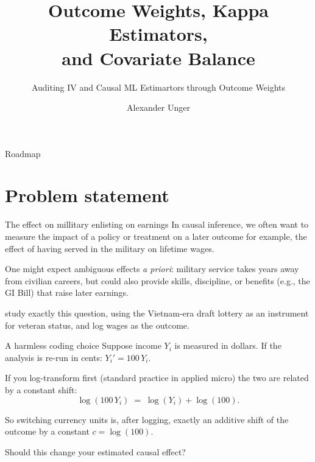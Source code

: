 \documentclass[11pt]{beamer}
\title{Outcome Weights, Kappa Estimators,\\ and Covariate Balance}
\subtitle{Auditing IV and Causal ML Estimartors through Outcome Weights}
\author{Alexander Unger}
\institute{University of T\"ubingen \\ Supervisor: JProf.\ Michael Knaus}
\begin{document}
\begin{frame}
\titlepage
\end{frame}

\begin{frame}{Roadmap}
\tableofcontents
\end{frame}

\section{Problem statement}




\begin{frame}{The effect on millitary enlisting on earnings}
In causal inference, we often want to measure the impact of a policy or treatment on a later outcome for example, the effect of having served in the military on lifetime wages.

\vspace{0.2cm}
One might expect ambiguous effects \textit{a priori}: military service takes years away from civilian careers, but could also provide skills, discipline, or benefits (e.g., the GI Bill) that raise later earnings.

\vspace{0.3cm}
\citet{sloczynski2025abadie} study exactly this question, using the Vietnam-era draft lottery \citet{angrist1990lifetime} as an instrument for veteran status, and log wages as the outcome.

\end{frame}


\begin{frame}{A harmless coding choice}
Suppose income $Y_i$ is measured in dollars. If the analysis is re-run in cents: $Y_i' = 100\,Y_i$.

\vspace{0.2cm}
If you log-transform first (standard practice in applied micro) the two are related by a constant shift:
\[
\log(100\,Y_i) \;=\; \log(Y_i) + \log(100).
\]

\vspace{0.2cm}
So switching currency units is, after logging, exactly an additive shift of the outcome by a constant $c = \log(100)$.

\vspace{0.3cm}
\centering \alert{Should this change your estimated causal effect?}
\end{frame}
\end{document}
